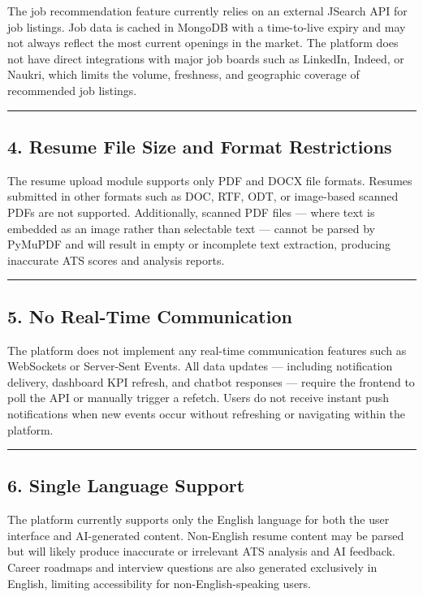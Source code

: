 \documentclass[12pt]{article}
\begin{document}
The job recommendation feature currently relies on an external JSearch API for job listings. Job data is cached in MongoDB with a time-to-live expiry and may not always reflect the most current openings in the market. The platform does not have direct integrations with major job boards such as LinkedIn, Indeed, or Naukri, which limits the volume, freshness, and geographic coverage of recommended job listings.

\noindent\rule{\textwidth}{0.4pt}

\subsection{4. Resume File Size and Format Restrictions}

The resume upload module supports only PDF and DOCX file formats. Resumes submitted in other formats such as DOC, RTF, ODT, or image-based scanned PDFs are not supported. Additionally, scanned PDF files — where text is embedded as an image rather than selectable text — cannot be parsed by PyMuPDF and will result in empty or incomplete text extraction, producing inaccurate ATS scores and analysis reports.

\noindent\rule{\textwidth}{0.4pt}

\subsection{5. No Real-Time Communication}

The platform does not implement any real-time communication features such as WebSockets or Server-Sent Events. All data updates — including notification delivery, dashboard KPI refresh, and chatbot responses — require the frontend to poll the API or manually trigger a refetch. Users do not receive instant push notifications when new events occur without refreshing or navigating within the platform.

\noindent\rule{\textwidth}{0.4pt}

\subsection{6. Single Language Support}

The platform currently supports only the English language for both the user interface and AI-generated content. Non-English resume content may be parsed but will likely produce inaccurate or irrelevant ATS analysis and AI feedback. Career roadmaps and interview questions are also generated exclusively in English, limiting accessibility for non-English-speaking users.
\end{document}
